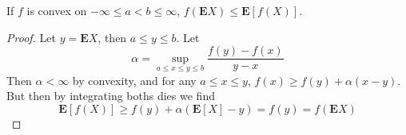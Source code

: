 \begin{theorem}
    If $f$ is convex on $-\infty \leq a < b \leq \infty$, $f(\mathbf{E}X) \leq \mathbf{E}[f(X)]$.
\end{theorem}
\begin{proof}
    Let $y = \mathbf{E}X$, then $a \leq y \leq b$. Let
    \[ \alpha = \sup_{a \leq x \leq y \leq b} \frac{f(y) - f(x)}{y - x} \]
    Then $\alpha < \infty$ by convexity, and for any $a \leq x \leq y$, $f(x) \geq f(y) + \alpha(x - y)$. But then by integrating boths dies we find
    \[ \mathbf{E}[f(X)] \geq f(y) + \alpha(\mathbf{E}[X] - y) = f(y) = f(\mathbf{E}X) \]
\end{proof}

